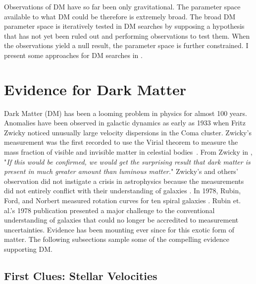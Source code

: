 Observations of DM have so far been only gravitational.
The parameter space available to what DM could be therefore is extremely broad.
The broad DM parameter space is iteratively tested in DM searches by supposing a hypothesis that has not yet been ruled out and performing observations to test them.
When the observations yield a null result, the parameter space is further constrained.
I present some approaches for DM searches in .

\section{Evidence for Dark Matter}\label{sec:evidence4dm}

Dark Matter (DM) has been a looming problem in physics for almost 100 years.
Anomalies have been observed in galactic dynamics as early as 1933 when Fritz Zwicky noticed unusually large velocity dispersions in the Coma cluster.
Zwicky's measurement was the first recorded to use the Virial theorem to measure the mass fraction of visible and invisible matter in celestial bodies~\cite{Hooper:DMHistory}.
From Zwicky in \cite{Zwicky:1933}, "\textit{If this would be confirmed, we would get the surprising result that dark matter is present in much greater amount than luminous matter.}"
Zwicky's and others' observation did not instigate a crisis in astrophysics because the measurements did not entirely conflict with their understanding of galaxies \cite{Hooper:DMHistory}.
In 1978, Rubin, Ford, and Norbert measured rotation curves for ten spiral galaxies \cite{Rubin:1978}.
Rubin et. al.'s 1978 publication presented a major challenge to the conventional understanding of galaxies that could no longer be accredited to measurement uncertainties.
Evidence has been mounting ever since for this exotic form of matter.
The following subsections sample some of the compelling evidence supporting DM.

\subsection{First Clues: Stellar Velocities\label{sec:ev4dm_stars}}

